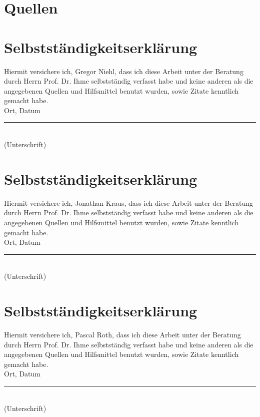 
\section*{Quellen}
\bib
\appendix

\newcommand{\selbststaendigkeitserklaerung}[1]{
	\newpage
	\section*{Selbstständigkeitserklärung}
	Hiermit versichere ich, {#1}, dass ich diese Arbeit unter der Beratung durch Herrn Prof. Dr. Ihme selbstständig verfasst habe und keine anderen als die angegebenen Quellen und Hilfsmittel benutzt wurden, sowie Zitate kenntlich gemacht habe. \\[2cm]

	Ort, Datum \hfill \rule{5cm}{0.4pt} \\
	\hfill (Unterschrift)
}

\selbststaendigkeitserklaerung{Gregor Niehl}
\selbststaendigkeitserklaerung{Jonathan Kraus}
\selbststaendigkeitserklaerung{Pascal Roth}
